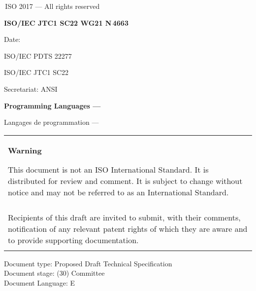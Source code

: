 

\thispagestyle{empty}
{\raisebox{.35ex}{\smaller\copyright}}\,ISO 2017 --- All rights reserved
\vspace{2ex}

\begin{flushright}
	\textbf{ISO/IEC JTC1 SC22 WG21 N\,\LARGE4663}
	
	Date: \reldate
	
	ISO/IEC PDTS 22277
	
	ISO/IEC JTC1 SC22
	
	Secretariat: ANSI
	
\end{flushright}

\vfill

\textbf{\LARGE Programming Languages --- \doctitle}

Langages de programmation --- \frtitle

\vfill

\begin{tabular}{|p{\hsize}|}
	\hline
	\begin{center}
		\textbf{Warning}
	\end{center}
	
	\vspace{2ex}
	
	This document is not an ISO International Standard. It is distributed
	for review and comment. It is subject to change without notice and may
	not be referred to as an International Standard.\\\\
	
	Recipients of this draft are invited to submit, with their comments,
	notification of any relevant patent rights of which they are aware
	and to provide supporting documentation.\\\\
	\hline
\end{tabular}

\vfill
\noindent
Document type: Proposed Draft Technical Specification\\
Document stage: (30) Committee\\
Document Language: E
\pagebreak

\thispagestyle{cpppage}

